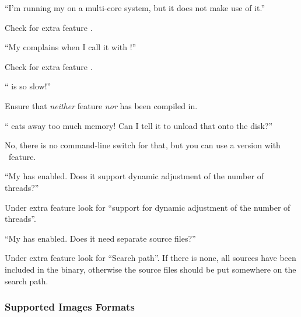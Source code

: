 \begin{qandalist}
\item
  ``I'm running my \appcmd{} on a multi-core system, but it does not make use of it.''
  \begin{qandaanswer}
    Check for extra feature .
  \end{qandaanswer}

\item
  ``My \appcmd{} complains when I call it with !''
  \begin{qandaanswer}
    Check for extra feature .
  \end{qandaanswer}

\item
  ``\appcmd{} is so slow!''
  \begin{qandaanswer}
    Ensure that \emph{neither} feature  \emph{nor}  has been
    compiled in.
  \end{qandaanswer}

  \item
    ``\appcmd{} eats away too much memory!  Can I tell it to unload that onto the disk?''
    \begin{qandaanswer}
      No, there is no command-line switch for that, but you can use a version with
      ~feature.
    \end{qandaanswer}

  \item
    ``My \appcmd{} has  enabled.  Does it support dynamic adjustment of the
    number of threads?''
    \begin{qandaanswer}
      Under extra feature  look for ``support for dynamic adjustment of the
      number of threads''.
    \end{qandaanswer}

  \item
    ``My \appcmd{} has  enabled.  Does it need separate  source
    files?''
    \begin{qandaanswer}
      Under extra feature  look for ``Search path''.  If there is none, all
      sources have been included in the binary, otherwise the  source files
      should be put somewhere on the  search path.
    \end{qandaanswer}
\end{qandalist}


\subsubsection[Image Formats]{\label{sec:image-formats}%
  Supported Images Formats}


